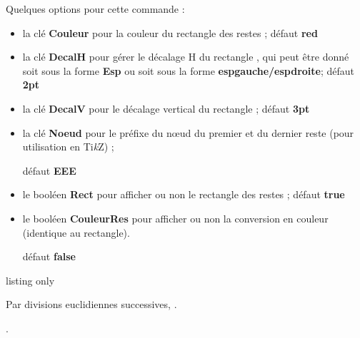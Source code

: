 \documentclass[a4paper,french,11pt]{article}
\providecommand\tikzlogo{Ti\textit{k}Z}
\let\TikZ\tikzlogo
\newcommand\Cle[1]{{\bfseries\sffamily\textlangle \textcolor{orange!75!black}{#1}\textrangle}}
\begin{document}
\begin{cautionblock}
Quelques options pour cette commande :

\begin{itemize}
	\item la clé \Cle{Couleur} pour la couleur du \og rectangle \fg{} des restes ; \hfill{}défaut \Cle{red}
	\item la clé \Cle{DecalH} pour gérer le décalage H du \og rectangle \fg{}, qui peut être donné soit sous la forme \Cle{Esp} ou soit sous la forme \Cle{espgauche/espdroite}; \hfill{}défaut \Cle{2pt}
	\item la clé \Cle{DecalV} pour le décalage vertical du \og rectangle \fg{} ; \hfill{}défaut \Cle{3pt}
	\item la clé \Cle{Noeud} pour le préfixe du nœud du premier et du dernier reste (pour utilisation en \TikZ) ;
	
	\hfill{}défaut \Cle{EEE}
	\item le booléen \Cle{Rect} pour afficher ou non le \og rectangle \fg{} des restes ; \hfill{}défaut \Cle{true}
	\item le booléen \Cle{CouleurRes} pour afficher ou non la conversion en couleur (identique au rectangle).
	
	\hfill{}défaut \Cle{false}
\end{itemize}
\vspace*{-\baselineskip}\leavevmode
\end{cautionblock}

\begin{PresCodeTexPL}{listing only}

Par divisions euclidiennes successives, .


.
\end{PresCodeTexPL}
\end{document}
